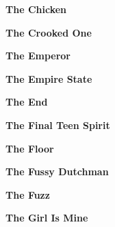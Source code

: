 \begin{center}\textbf{The Chicken}\end{center}
\newline
\vspace{10pt} 
\begin{center}\textbf{The Crooked One}\end{center}
\newline
\vspace{10pt} 
\begin{center}\textbf{The Emperor}\end{center}
\newline
\vspace{10pt} 
\begin{center}\textbf{The Empire State}\end{center}
\newline
\vspace{10pt} 
\begin{center}\textbf{The End}\end{center}
\newline
\vspace{10pt} 
\begin{center}\textbf{The Final Teen Spirit}\end{center}
\newline
\vspace{10pt} 
\begin{center}\textbf{The Floor}\end{center}
\newline
\vspace{10pt} 
\begin{center}\textbf{The Fussy Dutchman}\end{center}
\newline
\vspace{10pt} 
\begin{center}\textbf{The Fuzz}\end{center}
\newline
\vspace{10pt} 
\begin{center}\textbf{The Girl Is Mine}\end{center}
\newline
